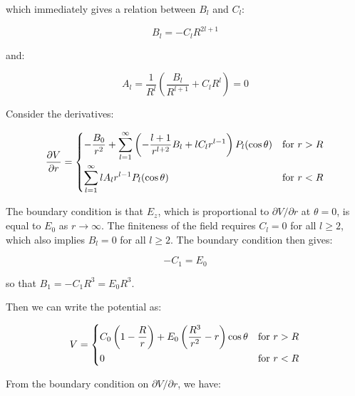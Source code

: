 \documentclass[12pt]{article}
\begin{document}
which immediately gives a relation between $B_{l}$ and $C_{l}$:

\begin{equation}
    B_{l} = -C_{l} R^{2l+1}
\end{equation}

and:

\begin{equation}
    A_{l} = \frac{1}{R^{l}} \left( \frac{B_{l}}{R^{l+1}} + C_{l} R^{l} \right) = 0
\end{equation}

Consider the derivatives:

\begin{equation}
    \frac{\partial V}{\partial r} =
    \begin{dcases}
        -\frac{B_{0}}{r^2} + \sum_{l=1}^{\infty} \left( -\frac{l+1}{r^{l+2}} B_{l} + l C_{l} r^{l-1} \right) P_{l}(\cos{\theta}) & \text{for } r > R \\
        \sum_{l=1}^{\infty} l A_{l} r^{l-1} P_{l}(\cos{\theta})                                                                  & \text{for } r < R
    \end{dcases}
\end{equation}

The boundary condition is that $E_{z}$, which is proportional to $\partial V/\partial r$ at $\theta = 0$, is equal to $E_{0}$ as $r \to \infty$. The finiteness of the field requires $C_{l} = 0$ for all $l \ge 2$, which also implies $B_{l} = 0$ for all $l \ge 2$. The boundary condition then gives:

\begin{equation}
    -C_{1} = E_{0}
\end{equation}

so that $B_{1} = -C_{1} R^{3} = E_{0} R^{3}$.

Then we can write the potential as:

\begin{equation}
    V =
    \begin{dcases}
        C_{0} \left( 1 - \frac{R}{r} \right) + E_{0} \left( \frac{R^{3}}{r^{2}} - r \right) \cos{\theta} & \text{for } r > R \\
        0                                                                                                & \text{for } r < R
    \end{dcases}
\end{equation}

From the boundary condition on $\partial V/\partial r$, we have:
\end{document}
